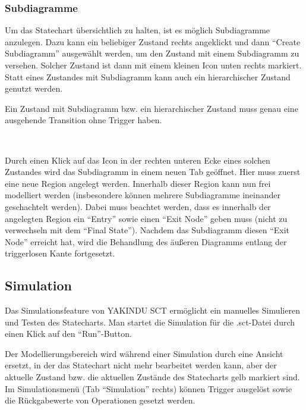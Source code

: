 \subsubsection{Subdiagramme}
Um das Statechart übersichtlich zu halten, ist es möglich Subdiagramme anzulegen. 
Dazu kann ein beliebiger Zustand rechts angeklickt und dann \enquote{Create Subdiagramm} ausgewählt werden, um den Zustand mit einem Subdiagramm zu versehen. 
Solcher Zustand ist dann mit einem kleinen Icon unten rechts markiert. 
Statt eines Zustandes mit Subdiagramm kann auch ein hierarchischer Zustand genutzt werden.

Ein Zustand mit Subdiagramm bzw. ein hierarchischer Zustand muss genau eine ausgehende Transition ohne Trigger haben. 

\begin{center}
	~~~~~~~~~~~
\end{center}
 
Durch einen Klick auf das Icon in der rechten unteren Ecke eines solchen Zustandes wird das Subdiagramm in einem neuen Tab geöffnet. 
Hier muss zuerst eine neue Region angelegt werden. 
Innerhalb dieser Region kann nun frei modelliert werden (insbesondere können mehrere Subdiagramme ineinander geschachtelt werden).
Dabei muss beachtet werden, dass es innerhalb der angelegten Region ein \enquote{Entry} sowie einen \enquote{Exit Node} geben muss (nicht zu verwechseln mit dem \enquote{Final State}). 
Nachdem das Subdiagramm diesen \enquote{Exit Node} erreicht hat, wird die Behandlung des äußeren Diagramms entlang der triggerlosen Kante fortgesetzt.




 



\subsection{Simulation}

Das Simulationsfeature von YAKINDU SCT ermöglicht ein manuelles Simulieren und Testen des Statecharts. 
Man startet die Simulation für die .sct-Datei durch einen Klick auf den \enquote{Run}-Button.

Der Modellierungsbereich wird während einer Simulation durch eine Ansicht ersetzt, in der das Statechart nicht mehr bearbeitet werden kann, aber der aktuelle Zustand bzw. die aktuellen Zustände des Statecharts gelb markiert sind.
Im Simulationsmenü (Tab \enquote{Simulation} rechts) können Trigger ausgelöst sowie die Rückgabewerte von Operationen gesetzt werden.

